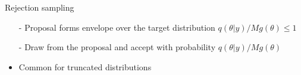 \documentclass[finnish,english,t]{beamer}
\begin{document}
\begin{frame}{Rejection sampling}

    \vspace{-.3\baselineskip}
  \begin{itemize}
  \item[-] Proposal forms envelope over the target distribution ${q(\theta|y)}/{M g(\theta)} \leq 1$
  \item[-] Draw from the proposal and accept with probability ${q(\theta|y)}/{M g(\theta)}$
  \item<3>[-] Common for truncated distributions
  \end{itemize}
  \begin{center}
    \vspace{-1.6\baselineskip}
  \end{center}

\end{frame}
\end{document}
